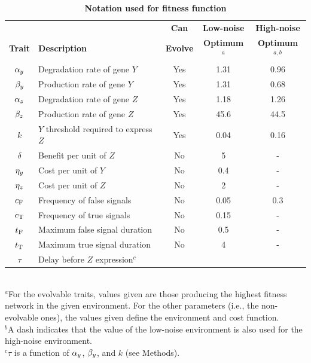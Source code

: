 \documentclass[dvips,12pt,twoside,titlepage]{article}
\begin{document}
\pagebreak
\normalsize

\renewcommand{\thetable}{\textbf{\arabic{table}}}
\begin{table}[p]
\caption{\textbf{Notation used for fitness function}}\label{params}
\vspace{0.3cm}
\begin{tabular}{c|p{6.5cm}|c|c|c}
\hline
\hline
               &                      & \textbf{Can}       & \textbf{Low-noise} & \textbf{High-noise} \\
\textbf{Trait} & \textbf{Description} & \textbf{Evolve} & \textbf{Optimum$^{a}$}   & \textbf{Optimum}$^{a,b}$ \\
\hline
$\alpha_{y}$     & Degradation rate of gene   $Y$        & Yes & 1.31  & 0.96 \\
$\beta_{y}$     & Production rate of gene $Y$           & Yes & 1.31  & 0.68 \\
$\alpha_{z}$     & Degradation rate of gene $Z$          & Yes & 1.18  & 1.26 \\
$\beta_{z}$     & Production rate of gene $Z$           & Yes & 45.6  & 44.5 \\
$k$       & $Y$ threshold required to express $Z$ & Yes & 0.04  & 0.16 \\
$\delta$  & Benefit per unit of $Z$               & No  & 5     & -    \\
$\eta_{y}$     & Cost per unit of $Y$                  & No  & 0.4   & -    \\
$\eta_{z}$     & Cost per unit of $Z$                  & No  & 2     & -    \\
$c_{\mathrm{F}}$     & Frequency of false signals            & No  & 0.05  & 0.3  \\
$c_{\mathrm{T}}$     & Frequency of true signals             & No  & 0.15  & -    \\
$t_{\mathrm{F}}$     & Maximum false signal duration         & No  & 0.5   & -    \\
$t_{\mathrm{T}}$     & Maximum true signal duration          & No  & 4     & -    \\
$\tau$    & Delay before $Z$ expression$^c$       &     &       &      \\
\hline
\end{tabular}\vspace{0.2cm}\\
$^{a}$\small{For the evolvable traits, values given are those producing the highest fitness network in the given environment. For the other parameters (i.e., the non-evolvable ones), the values given define the environment and cost function.}\\
$^{b}$\small{A dash indicates that the value of the low-noise environment is also used for the high-noise environment.} \\
$^{c}$\small{$\tau$ is a function of $\alpha_{y}$, $\beta_{y}$, and $k$ (see Methods).}
\end{table}
\clearpage
\end{document}
